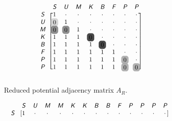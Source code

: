\tikzexternaldisable
\begin{figure}
\centering
\begin{subfigure}[b]{\columnwidth}
\centering
\begin{align*}
\scalemath{0.9}{
\begin{blockarray}{ccccccccc}
& \xcolor{S} & \xcolor{U} & \xcolor{M} & \xcolor{K} & \xcolor{B} & \xcolor{F} & \xcolor{P} & \xcolor{P} \\
\begin{block}{c[cccccccc]}
\xcolor{S} & 1 & \cdot & \cdot & \cdot & \cdot & \cdot & \cdot & \cdot \\
\xcolor{U} & \hlight{0}{20} & 1 & \cdot & \cdot & \cdot & \cdot & \cdot & \cdot \\
\xcolor{M} & \hlight{0}{55} & \hlight{0}{55} & 1 & \cdot & \cdot & \cdot & \cdot & \cdot  \\
\xcolor{K} & 1 & 1 & 1 & \hlight{0}{90} & \cdot & \cdot & \cdot & \cdot  \\
\xcolor{B} & 1 & 1 & 1 & 1 & \hlight{0}{90} & \cdot & \cdot & \cdot  \\
\xcolor{F} & 1 & 1 & 1 & 1 & 1 & 1 & \cdot & \cdot  \\
\xcolor{P} & 1 & 1 & 1 & 1 & 1 & 1 & \hlight{0}{37.5} & \cdot \\
\xcolor{P} & 1 & 1 & 1 & 1 & 1 & 1 & \hlight{0}{37.5} & \hlight{0}{37.5} \\
\end{block}
\end{blockarray}
}
\end{align*}
\caption{Reduced potential adjacency matrix $A_R$.\label{fig:ch2:suspension2_1}}
\end{subfigure}
% 
\begin{subfigure}[b]{\columnwidth}
\vspace{0.3in}
\centering
\begin{align*}
\scalemath{0.9}{
\begin{blockarray}{cccccccccccccc}
& \xcolor{S} & \xcolor{U} & \xcolor{M} & \xcolor{M} & \xcolor{K} & \xcolor{K} & \xcolor{B} & \xcolor{B} & \xcolor{F} & \xcolor{P} & \xcolor{P} & \xcolor{P} & \xcolor{P} \\
\begin{block}{c[ccccccccccccc]}
\xcolor{S} & \tikzmark{top}{1} & \cdot & \cdot & \cdot & \cdot & \cdot & \cdot & \cdot & \cdot & \cdot & \cdot & \cdot & \cdot \\

\end{block}
\end{blockarray}}
\end{align*}
\end{subfigure}
\end{figure}
